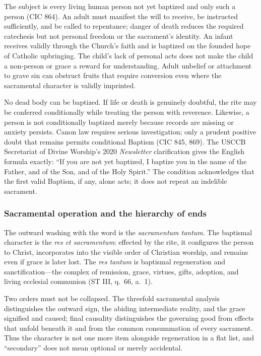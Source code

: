 The subject is every living human person not yet baptized and only such a person (CIC 864). An adult must manifest the will to receive, be instructed sufficiently, and be called to repentance; danger of death reduces the required catechesis but not personal freedom or the sacrament's identity. An infant receives validly through the Church's faith and is baptized on the founded hope of Catholic upbringing. The child's lack of personal acts does not make the child a non-person or grace a reward for understanding. Adult unbelief or attachment to grave sin can obstruct fruits that require conversion even where the sacramental character is validly imprinted.

No dead body can be baptized. If life or death is genuinely doubtful, the rite may be conferred conditionally while treating the person with reverence. Likewise, a person is not conditionally baptized merely because records are missing or anxiety persists. Canon law requires serious investigation; only a prudent positive doubt that remains permits conditional Baptism (CIC 845, 869). The USCCB Secretariat of Divine Worship's 2020 \emph{Newsletter} clarification gives the English formula exactly: ``If you are not yet baptized, I baptize you in the name of the Father, and of the Son, and of the Holy Spirit.'' The condition acknowledges that the first valid Baptism, if any, alone acts; it does not repeat an indelible sacrament.

\subsubsection{Sacramental operation and the hierarchy of ends}

The outward washing with the word is the \emph{sacramentum tantum}. The baptismal character is the \emph{res et sacramentum}: effected by the rite, it configures the person to Christ, incorporates into the visible order of Christian worship, and remains even if grace is later lost. The \emph{res tantum} is baptismal regeneration and sanctification---the complex of remission, grace, virtues, gifts, adoption, and living ecclesial communion (ST III, q.~66, a.~1).

Two orders must not be collapsed. The threefold sacramental analysis distinguishes the outward sign, the abiding intermediate reality, and the grace signified and caused; final causality distinguishes the governing good from effects that unfold beneath it and from the common consummation of every sacrament. Thus the character is not one more item alongside regeneration in a flat list, and ``secondary'' does not mean optional or merely accidental.

